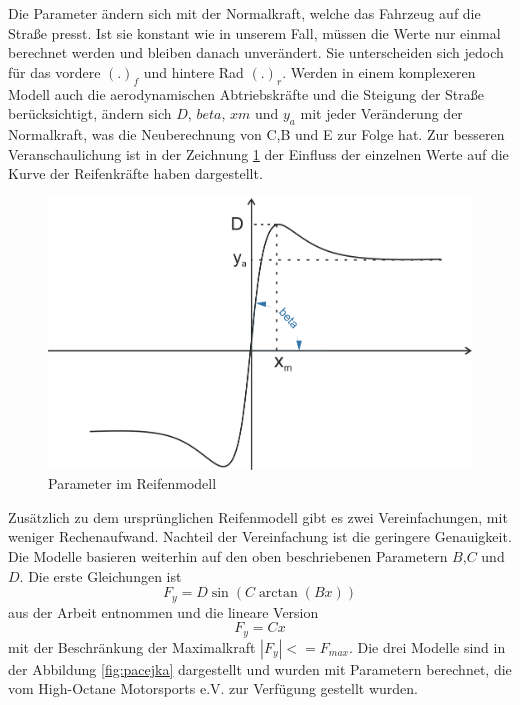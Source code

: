 \documentclass{like}
\begin{document}
Die Parameter ändern sich mit der Normalkraft, welche das Fahrzeug auf die Straße presst. Ist sie konstant wie in unserem Fall, müssen die Werte nur einmal berechnet werden und bleiben danach unverändert. Sie unterscheiden sich jedoch für das vordere $(.)_f$ und hintere Rad $(.)_r$. Werden in einem komplexeren Modell auch die aerodynamischen Abtriebskräfte und die Steigung der Straße berücksichtigt, ändern sich $D$, $beta$, $xm$ und $y_a$ mit jeder Veränderung der Normalkraft, was die Neuberechnung von C,B und E zur Folge hat. Zur besseren Veranschaulichung ist in der Zeichnung \ref{fig:tireModelParameter} der Einfluss der einzelnen Werte auf die Kurve der Reifenkräfte haben dargestellt. 

\begin{figure}[ht!]
	\centering
	\includegraphics[width=350pt]{Abbildungen/tireModel.png}
	\caption{Parameter im Reifenmodell}
	\label{fig:tireModelParameter}
\end{figure}
 
Zusätzlich zu dem ursprünglichen Reifenmodell gibt es zwei Vereinfachungen, mit weniger Rechenaufwand. Nachteil der Vereinfachung ist die geringere Genauigkeit. Die Modelle basieren weiterhin auf den oben beschriebenen Parametern \(B\),\(C\) und \(D\). Die erste Gleichungen ist 
\begin{equation}
	F_y = D\sin(C\arctan(Bx))
\end{equation} 
aus der Arbeit \cite{rc_car_1_43} entnommen und die lineare Version 
\begin{equation}
	F_y = C x 
\end{equation} 
mit der Beschränkung der Maximalkraft $|F_y| <= F_{max} $.
Die drei Modelle sind in der Abbildung \ref{fig:pacejka} dargestellt und wurden mit Parametern berechnet, die vom High-Octane Motorsports e.V. zur Verfügung gestellt wurden.
\end{document}
